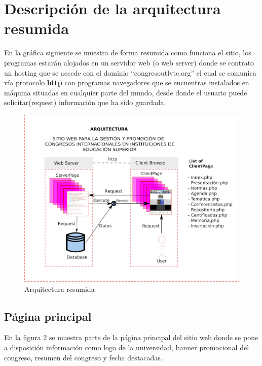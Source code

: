 \documentclass[a4paper,14px]{article}
\begin{document}
\section{Descripción de la arquitectura resumida}
\label{sec:descripcion-de-la}


En la gráfica siguiente se muestra de forma resumida como funciona el sitio, los programas estarán alojados en un servidor web (o web server) donde se contrato un hosting que se accede con el  dominio ``congresoutlvte.org'' el cual se comunica vía protocolo \textbf{http} con programas navegadores que se encuentras instalados en máquina situadas en cualquier parte del mundo, desde donde el usuario puede solicitar(request) información  que ha sido guardada. \\


\begin{figure}[H]
  \centering
  \includegraphics[scale=0.3]{congresoweb.jpg}
  \caption{Arquitectura resumida}
  \label{fig:arquitectura}
\end{figure}


\newpage
\subsection{Página principal}
\label{sec:pagina-principal}

En la figura 2 se muestra parte de la página principal del sitio web donde se pone a disposición información como logo de la universidad, banner promocional del congreso, resumen del congreso y fecha destacadas.
\end{document}
